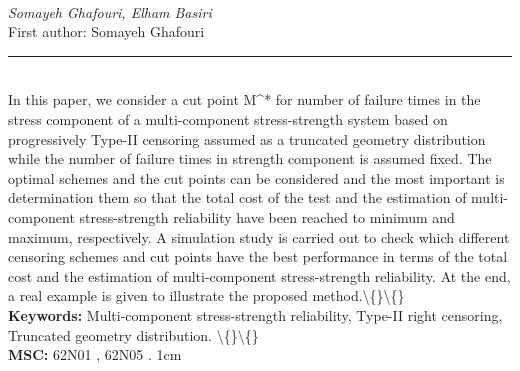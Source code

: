 \documentclass[10pt,twoside]{article}
\begin{document}
\noindent\begin{minipage}[t][\textheight]{\textwidth}
\\[0.35em]
{\itshape Somayeh Ghafouri, Elham Basiri}\\[0.2em]
{\footnotesize First author: Somayeh Ghafouri}\\[0.45em]
\noindent\rule{\textwidth}{0.3pt}\\[0.4em]
{\footnotesize  In this paper, we consider a cut point M\textasciicircum{}* for number of failure times in the stress component of a multi-component stress-strength system based on progressively Type-II censoring assumed as a truncated geometry distribution while the number of failure times in strength component is assumed fixed. The optimal schemes and the cut points can be considered and the most important is determination them so that the total cost of the test and the estimation of multi-component stress-strength reliability have been reached to minimum and maximum, respectively. A simulation study is carried out to check which different censoring schemes and cut points have the best performance in terms of the total cost and the estimation of multi-component stress-strength reliability. At the end, a real example is given to illustrate the proposed method.\textbackslash\{\}\textbackslash\{\}}\\[0.4em]
{\footnotesize\bfseries Keywords:} {\footnotesize Multi-component stress-strength reliability, Type-II right censoring, Truncated geometry distribution. \textbackslash\{\}\textbackslash\{\}}\\[0.15em]
{\footnotesize\bfseries MSC:} {\footnotesize 62N01 , 62N05 . 1cm}\\
\vfill
\end{minipage}
\newpage
\end{document}
